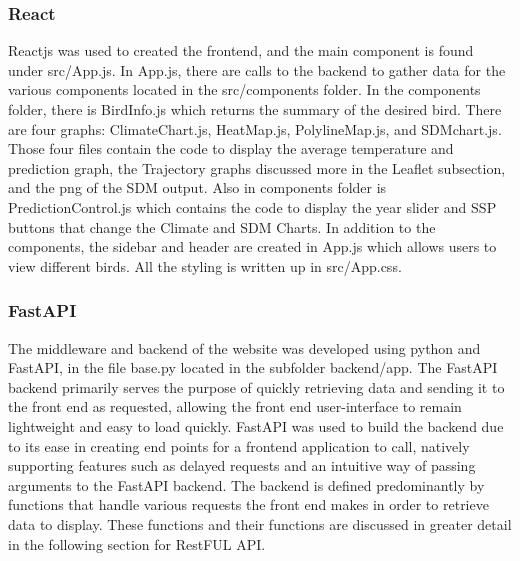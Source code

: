 \documentclass{article}
\begin{document}
\subsubsection*{React}
Reactjs was used to created the frontend, and the main component is found under src/App.js. In App.js, there are calls to the backend to gather data for the various components
located in the src/components folder. In the components folder, there is BirdInfo.js which returns the summary of the desired bird. There are four graphs: ClimateChart.js,
HeatMap.js, PolylineMap.js, and SDMchart.js. Those four files contain the code to display the average temperature and prediction graph, the Trajectory graphs discussed more 
in the Leaflet subsection, and the png of the SDM output. Also in components folder is PredictionControl.js which contains the code to display the year slider and SSP buttons that 
change the Climate and SDM Charts. In addition to the components, the sidebar and header are created in App.js which allows users to view different birds. All the styling is written 
up in src/App.css. 

\subsubsection*{FastAPI}
The middleware and backend of the website was developed using python and FastAPI, in the file base.py located in the subfolder backend/app. The FastAPI backend primarily serves the purpose of quickly retrieving data and sending it to the front end as requested, allowing the front end user-interface to remain lightweight and easy to load quickly. FastAPI was used to build the backend due to its ease in creating end points for a frontend application to call, natively supporting features such as delayed requests and an intuitive way of passing arguments to the FastAPI backend.
The backend is defined predominantly by functions that handle various requests the front end makes in order to retrieve data to display. These functions and their functions are discussed in greater detail in the following section for RestFUL API.
\end{document}
